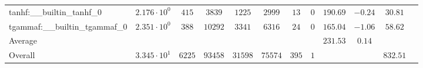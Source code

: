 \begin{tabular}{|l|c|c|c|c|c|c|c|c|c|c|c|}
tanhf:\_\_builtin\_tanhf\_0               & $ 2.176 \cdot 10^{0}  $ & $ 415    $ & $ 3839  $ & $ 1225  $ & $ 2999  $ & $ 13  $ & $ 0 $ & $ 190.69      $ & $ -0.24   $ & $ 30.81   $ \\
tgammaf:\_\_builtin\_tgammaf\_0           & $ 2.351 \cdot 10^{0}  $ & $ 388    $ & $ 10292 $ & $ 3341  $ & $ 6316  $ & $ 24  $ & $ 0 $ & $ 165.04      $ & $ -1.06   $ & $ 58.62   $ \\
\hline
Average                                   & $                     $ & $        $ & $       $ & $       $ & $       $ & $     $ & $   $ & $ 231.53      $ & $ 0.14    $ & $         $ \\
\hline
Overall                                   & $ 3.345 \cdot 10^{1}  $ & $ 6225   $ & $ 93458 $ & $ 31598 $ & $ 75574 $ & $ 395 $ & $ 1 $ & $             $ & $         $ & $ 832.51  $ \\
\hline
\end{tabular}
